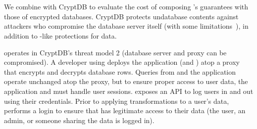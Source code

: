 \section{\syscrypt}
\label{s:eval-cryptdb}

We combine \sys with CryptDB to evaluate the cost of composing \sys's guarantees
with those of encrypted databases.
%
%
CryptDB protects un\xxed database contents against attackers who compromise
the database server itself (with some limitations~\cite{grubbs}), in addition
to \sys-like protections for \xxed data.
%
%

%
\syscrypt operates in CryptDB's threat model 2 (database server and proxy can be
compromised).
%
A developer using \syscrypt deploys the application (and \sys) atop a proxy that
encrypts and decrypts database rows.
%
%
%
%
%
%
Queries from \sys and the application operate unchanged atop the proxy, but to
ensure proper access to user data, the application and \sys must handle user
sessions.
%
\syscrypt exposes an API to log users in and out using their credentials.  Prior to applying
transformations to a user's data, \sys performs a login to ensure that \sys has
legitimate access to their data (\eg the user, an admin, or someone sharing the
data is logged in).

